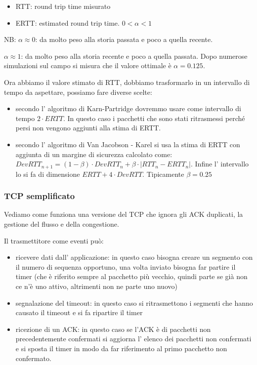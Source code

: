 \begin{itemize}
    \item RTT: round trip time misurato
    \item ERTT: estimated round trip time. $0 < \alpha < 1$
\end{itemize}

NB: $\alpha \approx 0$: da molto peso alla storia passata e poco a quella recente.

$\alpha \approx 1$: da molto peso alla storia recente e poco a quella passata.
Dopo numerose simulazioni sul campo si misura che il valore ottimale è $\alpha = 0.125$.

Ora abbiamo il valore stimato di RTT, dobbiamo trasformarlo in un intervallo di tempo da aspettare, possiamo fare diverse scelte:
\begin{itemize}
    \item secondo l' algoritmo di Karn-Partridge dovremmo usare come intervallo di tempo $2 \cdot ERTT$.
    In questo caso i pacchetti che sono stati ritrasmessi perché persi non vengono aggiunti alla stima di ERTT.
    
    \item secondo l' algoritmo di Van Jacobson - Karel si usa la stima di ERTT con aggiunta di un margine di sicurezza calcolato come: $DevRTT_{n+1} = (1-\beta)\cdot DevRTT_n + \beta\cdot|RTT_n - ERTT_n|$.
    Infine l' intervallo lo si fa di dimensione $ERTT + 4 \cdot DevRTT$.
    Tipicamente $\beta=0.25$
\end{itemize}

\subsubsection{TCP semplificato}
Vediamo come funziona una versione del TCP che ignora gli ACK duplicati, la gestione del flusso e della congestione.

Il trasmettitore come eventi può:
\begin{itemize}
    \item ricevere dati dall' applicazione: in questo caso bisogna creare un segmento con il numero di sequenza opportuno, una volta inviato bisogna far partire il timer (che è riferito sempre al pacchetto più vecchio, quindi parte se già non ce n'è uno attivo, altrimenti non ne parte uno nuovo)
    
    \item segnalazione del timeout: in questo caso si ritrasmettono i segmenti che hanno causato il timeout e si fa ripartire il timer
    
    \item ricezione di un ACK: in questo caso se l'ACK è di pacchetti non precedentemente confermati si aggiorna l' elenco dei pacchetti non confermati e si sposta il timer in modo da far riferimento al primo pacchetto non confermato.
\end{itemize}

